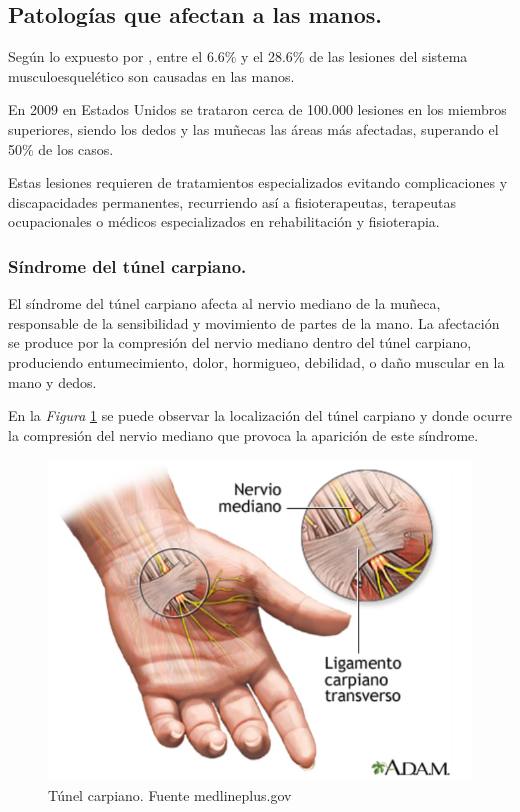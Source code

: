 \subsection{Patologías que afectan a las manos.}

Según lo expuesto por \cite{arroyo-berezowsky_epidemiology_2021}, entre el 6.6\% y el 28.6\% de las lesiones del sistema musculoesquelético son causadas en las manos.

En 2009 en Estados Unidos se trataron cerca de 100.000 lesiones en los miembros superiores, siendo los dedos y las muñecas las áreas más afectadas, superando el 50\% de los casos. \cite{arroyo-berezowsky_epidemiology_2021}

Estas lesiones requieren de tratamientos especializados evitando complicaciones y discapacidades permanentes, recurriendo así a fisioterapeutas, terapeutas ocupacionales o médicos especializados en rehabilitación y fisioterapia.  
\cite{arroyo-berezowsky_epidemiology_2021}

\subsubsection{Síndrome del túnel carpiano.}

El síndrome del túnel carpiano afecta al nervio mediano de la muñeca, responsable de la sensibilidad y movimiento de partes de la mano. La afectación se produce por la compresión del nervio mediano dentro del túnel carpiano, produciendo entumecimiento, dolor, hormigueo, debilidad, o daño muscular en la mano y dedos. \cite{sindrome_tunel}

En la \textit{Figura} \ref{fig:Tunel_carpiano} se puede observar la localización del túnel carpiano y donde ocurre la compresión del nervio mediano que provoca la aparición de este síndrome. \cite{sindrome_tunel}
\begin{figure}
    \centering
    \includegraphics[width=0.5\linewidth]{img/Tunel_carpiano.png}
    \caption{Túnel carpiano. Fuente medlineplus.gov}
    \label{fig:Tunel_carpiano}
\end{figure}
